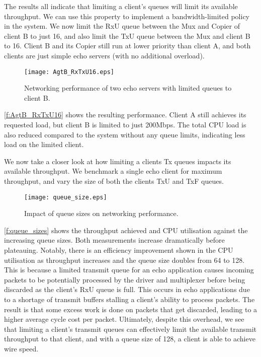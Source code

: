 The results all indicate that limiting a client's queues will limit its available throughput. We can use this property to implement 
a bandwidth-limited policy in the system. We now limit the RxU queue between the Mux and Copier of client B to just 16, and also
limit the TxU queue between the Mux and client B to 16. Client B and its Copier still run at lower priority than client A, and both
clients are just simple echo servers (with no additional overload).

\begin{figure}[h]
    \centering
    \texttt{[image: AgtB\_RxTxU16.eps]}
    \caption{Networking performance of two echo servers with limited queues to client B.}
    \label{f:AgtB_RxTxU16}
\end{figure}

\autoref{f:AgtB_RxTxU16} shows the resulting performance. Client A still achieves its requested load, but client B is limited
to just 200Mbps. The total CPU load is also reduced compared to the system without any queue limits, indicating less load on 
the limited client.

We now take a closer look at how limiting a clients Tx queues impacts its available throughput. We benchmark a single 
echo client for maximum throughput, and vary the size of both the clients TxU and TxF queues. 

\begin{figure}[h]
    \centering
    \texttt{[image: queue\_size.eps]}
    \caption{Impact of queue sizes on networking performance.}
    \label{f:queue_sizes}
\end{figure}

\autoref{f:queue_sizes} shows the throughput achieved and CPU utilisation against the increasing queue sizes. Both 
measurements increase dramatically before plateauing. Notably, there is an efficiency improvement shown in the CPU utilisation
as throughput increases and the queue size doubles from 64 to 128. This is because a limited transmit queue
for an echo application causes incoming packets to be potentially processed by the driver and multiplexer before 
being discarded as the client's RxU queue is full.
This occurs in echo applications due to a shortage of transmit buffers stalling a client's ability to process packets. The
result is that some excess work is done on packets that get discarded, leading to a higher average cycle cost per packet. 
Ultimately, despite this overhead, we see that limiting a client's transmit queues can effectively limit the available transmit
throughput to that client, and with a queue size of 128, a client is able to achieve wire speed.

